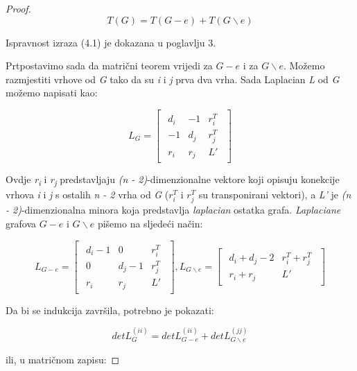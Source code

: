 \documentclass[times, utf8, zavrsni]{fer}
\begin{document}
\begin{proof}
\begin{equation}
	T(G) = T(G - e) + T(G \backslash e)
\end{equation}

Ispravnost izraza (4.1) je dokazana u poglavlju 3.

Prtpostavimo sada da matrični teorem vrijedi za $G - e$ i za $G \backslash e$. Možemo razmjestiti vrhove od \textit{G} tako da su \textit{i} i \textit{j} prva dva vrha. Sada Laplacian \textit{L} od \textit{G} možemo napisati kao:

\[
L_G =
\begin{bmatrix}
	\begin{array}{c|c|c}
		d_i & -1 & r_i^T \\
		\hline
		-1 & d_j & r_j^T \\
		\hline
		r_i & r_j & L'
	\end{array}
\end{bmatrix}
\]

Ovdje \textit{r\textsubscript{i}} i \textit{r\textsubscript{j}} predstavljaju \textit{(n - 2)}-dimenzionalne vektore koji opisuju konekcije vrhova \textit{i} i \textit{j} s ostalih \textit{n - 2} vrha od \textit{G} ($r_i^T$ i $r_j^T$ su transponirani vektori), a \textit{L'} je \textit{(n - 2)}-dimenzionalna minora koja predstavlja \textit{laplacian} ostatka grafa. \textit{Laplaciane} grafova $G - e$ i $G \backslash e$ pišemo na sljedeći način:

\[
L_{G - e} = 
\begin{bmatrix}
	\begin{array}{c|c|c}
		d_i - 1 & 0 & r_i^T \\
		\hline
		0 & d_j - 1 & r_j^T \\
		\hline
		r_i & r_j & L'
	\end{array}
\end{bmatrix},
L_{G \backslash e} = 
\begin{bmatrix}
	\begin{array}{c|c}
		d_i + d_j - 2 & r_i^T + r_j^T \\
		\hline
		r_i + r_j & L'
	\end{array}
\end{bmatrix}
\]

Da bi se indukcija završila, potrebno je pokazati:

\begin{equation}
	detL_G^{(ii)} = detL_{G - e}^{(ii)} + detL_{G \backslash e}^{(jj)}
\end{equation}

ili, u matričnom zapisu:


\end{proof}
\end{document}
